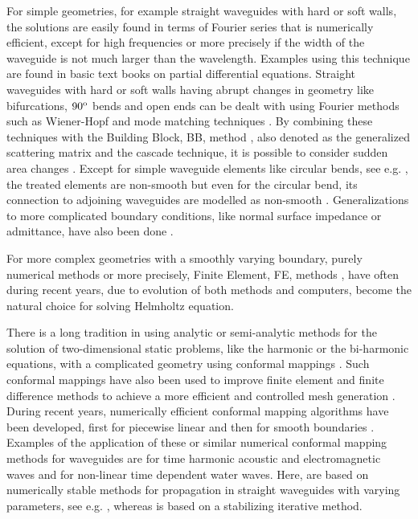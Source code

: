 \documentclass[numreferences]{kluwer}
\begin{document}
For simple geometries, for example straight waveguides with hard or
soft walls, the solutions are easily found in terms of Fourier series
that is numerically efficient, except for high frequencies or more
precisely if the width of the waveguide is not much larger than the
wavelength. Examples using this technique are found in basic text
books on partial differential equations. Straight waveguides with hard
or soft walls having abrupt changes in geometry like bifurcations,
$90^{\tiny{\rm o}}$ bends and open ends can be dealt with using
Fourier methods such as Wiener-Hopf and mode matching techniques
\cite{mittralee1971}. By combining these techniques with the Building
Block, BB, method \cite{nilssonbrander1981b}, also denoted as the
generalized scattering matrix \cite{mittralee1971} and the cascade
\cite{jones1986} technique, it is possible to consider sudden area
changes \cite{mittralee1971,nilssonbrander1981b}. Except for simple
waveguide elements like circular bends, see
e.g. \cite{bironilsson2005}, the treated elements are non-smooth but
even for the circular bend, its connection to adjoining waveguides are
modelled as non-smooth \cite{bironilsson2005}. Generalizations to more
complicated boundary conditions, like normal surface impedance or admittance, have also
been done \cite{buyukaksoycinar2005}.

For more complex geometries with a smoothly varying boundary, purely
numerical methods or more precisely, Finite Element, FE, methods
\cite{zienkiewicz+taylor+zhu:2008,Ihlenburg:1998}, have often during
recent years, due to evolution of both methods and computers, become
the natural choice for solving Helmholtz equation.

There is a long tradition in using analytic or semi-analytic methods
for the solution of two-dimensional static problems, like the harmonic
or the bi-harmonic equations, with a complicated geometry using
conformal mappings \cite{muskhelishvili:1962}. Such conformal mappings
have also been used to improve finite element and finite difference
methods to achieve a more efficient and controlled mesh generation
\cite{ives+liutermoza:1977}. During recent years, numerically
efficient conformal mapping algorithms have been developed, first for
piecewise linear \cite{sctoolbox2} and then for smooth boundaries
\cite{andersson-outpol:2008,andersson-acf:2009}. Examples of the
application of these or similar numerical conformal mapping methods
for waveguides are \cite{Andersson:2006,Andersson-Nilsson:2009} for
time harmonic acoustic and electromagnetic waves and
\cite{nachbin+daSilvaSimoes:2012} for non-linear time dependent water
waves. Here, \cite{andersson-outpol:2008,andersson-acf:2009} are based
on numerically stable methods for propagation in straight waveguides
with varying parameters, see e.g. \cite{Fishman:1998,Nilsson:2002},
whereas \cite{nachbin+daSilvaSimoes:2012} is based on a stabilizing
iterative method.
\end{document}
